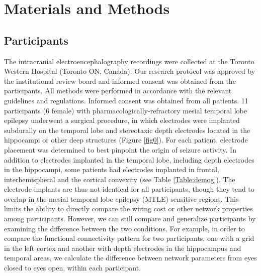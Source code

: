 \documentclass[11pt, onecolumn]{article}
\begin{document}
\section{Materials and Methods}
\label{se:maandme}
\subsection{Participants}

The intracranial electroencephalography recordings were collected at the Toronto Western Hospital (Toronto ON, Canada). Our research protocol was approved by the institutional review board and informed consent was obtained from the participants. All methods were performed in accordance with the relevant guidelines and regulations. Informed consent was obtained from all patients.
11 participants (6 female) with pharmacologically-refractory mesial temporal lobe epilepsy underwent a surgical procedure, in which electrodes were implanted subdurally on the temporal lobe and stereotaxic depth electrodes located in the hippocampi or other deep structures (Figure \ref{fig0}).
For each patient, electrode placement was determined to
best pinpoint the origin of seizure activity. In addition to electrodes implanted in the temporal lobe, including depth electrodes in the hippocampi, some patients had electrodes implanted in frontal, interhemispheral and the cortical convexity (see Table \ref{Table:demog}). The electrode implants are thus not identical for all participants, though they tend to overlap in the mesial temporal lobe epilepsy (MTLE) sensitive regions. This limits the ability to directly compare the wiring cost or other network properties among participants. However, we can still compare and generalize participants by examining the difference between the two conditions. For example, in order to compare the functional connectivity pattern for two participants, one with a grid in the left cortex and another with depth electrodes in the hippocampus and temporal areas, we calculate the difference between network parameters from eyes closed to eyes open, within each participant.
\end{document}
